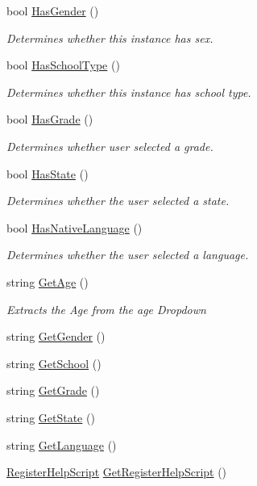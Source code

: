 \begin{DoxyCompactItemize}
bool \hyperlink{classRegisterScene2Controller_a1e1e22096293701416e0c2b471e22284}{Has\+Gender} ()
\begin{DoxyCompactList}\small\item\em Determines whether this instance has sex. \end{DoxyCompactList}\item 
bool \hyperlink{classRegisterScene2Controller_a19e707aac8d6d7e9d6af8f53f086be24}{Has\+School\+Type} ()
\begin{DoxyCompactList}\small\item\em Determines whether this instance has school type. \end{DoxyCompactList}\item 
bool \hyperlink{classRegisterScene2Controller_a051efecaea664a6a5766db397932e0e8}{Has\+Grade} ()
\begin{DoxyCompactList}\small\item\em Determines whether user selected a grade. \end{DoxyCompactList}\item 
bool \hyperlink{classRegisterScene2Controller_a9f35a4fccc3c148375a02c18768e3d0a}{Has\+State} ()
\begin{DoxyCompactList}\small\item\em Determines whether the user selected a state. \end{DoxyCompactList}\item 
bool \hyperlink{classRegisterScene2Controller_a5ce68b1c110e3e97f1a9b871ab84628f}{Has\+Native\+Language} ()
\begin{DoxyCompactList}\small\item\em Determines whether the user selected a language. \end{DoxyCompactList}\item 
string \hyperlink{classRegisterScene2Controller_ade60e30592994cf279a6ffb48699ac5e}{Get\+Age} ()
\begin{DoxyCompactList}\small\item\em Extracts the Age from the age Dropdown \end{DoxyCompactList}\item 
string \hyperlink{classRegisterScene2Controller_a3b9df3bcb8be64cec2f585fc15722ab8}{Get\+Gender} ()
\item 
string \hyperlink{classRegisterScene2Controller_a483aca44c55921de0f4e5f179293aac8}{Get\+School} ()
\item 
string \hyperlink{classRegisterScene2Controller_a3b88ef07951d1921527b8c28db808b4f}{Get\+Grade} ()
\item 
string \hyperlink{classRegisterScene2Controller_a661487ca4b9ec0eb4e6b94ab72046d60}{Get\+State} ()
\item 
string \hyperlink{classRegisterScene2Controller_aec92c86de19a073d747cb6845988819d}{Get\+Language} ()
\item 
\hyperlink{classRegisterHelpScript}{Register\+Help\+Script} \hyperlink{classRegisterScene2Controller_adb49d928e3420b5c3971ee46741a5823}{Get\+Register\+Help\+Script} ()
\end{DoxyCompactItemize}
